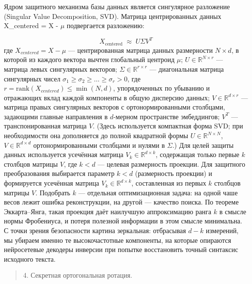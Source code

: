 \documentclass[a4paper, 12pt, oneside, openany]{article}
\begin{document}
Ядром защитного механизма базы данных является сингулярное разложение (Singular Value Decomposition, SVD). Матрица центрированных данных X\_centered = X - $\mu$ подвергается разложению:

\begin{equation}
	X_{\mathrm{centered}} \;\approx\; U \Sigma V^{T}
	\label{eq:4-4}
\end{equation}
где \(X_{centered} = X - \mu\) --- центрированная матрица данных размерности \(N \times d\), в которой из каждого вектора вычтен глобальный центроид \(\mu\); \(U \in \mathbb{R}^{N \times r}\) --- матрица левых сингулярных векторов; \(\Sigma \in \mathbb{R}^{r \times r}\) --- диагональная матрица сингулярных чисел \(\sigma_{1} \geq \sigma_{2} \geq \ldots \geq \sigma_{r} > 0\), где $r = \mathrm{rank}(X_{centered}) \leq \min(N, d)$, упорядоченных по убыванию и отражающих вклад каждой компоненты в общую дисперсию данных; \(V \in \mathbb{R}^{d \times r}\) --- матрица правых сингулярных векторов с ортонормированными столбцами, задающими главные направления в \(d\)-мерном пространстве эмбеддингов; \(V^{T}\) --- транспонированная матрица \(V\). (Здесь используется компактная форма SVD; при необходимости она дополняется до полной квадратной формы $U \in \mathbb{R}^{N \times N}$, $V \in \mathbb{R}^{d \times d}$ ортонормированными столбцами и нулями в $\Sigma$.) Для целей защиты данных используется усечённая матрица \(V_{k} \in \mathbb{R}^{d \times k}\), содержащая только первые \(k\) столбцов матрицы \(V\), где \(k < d\) --- целевая размерность проекции. Для защитного преобразования выбирается параметр $k < d$ (размерность проекции) и формируется усечённая матрица $V_k \in \mathbb{R}^{d \times k}$, составленная из первых $k$ столбцов матрицы $V$. Подобрать $k$ — отдельная оптимизационная задача: на одной чаше весов лежит ошибка реконструкции, на другой — качество поиска. По теореме Эккарта–Янга, такая проекция даёт наилучшую аппроксимацию ранга $k$ в смысле нормы Фробениуса, и потеря полезной информации в этом смысле минимальна. С точки зрения безопасности картина зеркальная: отбрасывая $d - k$ измерений, мы убираем именно те высокочастотные компоненты, на которые опираются нейросетевые декодеры инверсии при попытке восстановить точный синтаксис исходного текста.

\begin{quote}
	4. Секретная ортогональная ротация.
\end{quote}
\end{document}
